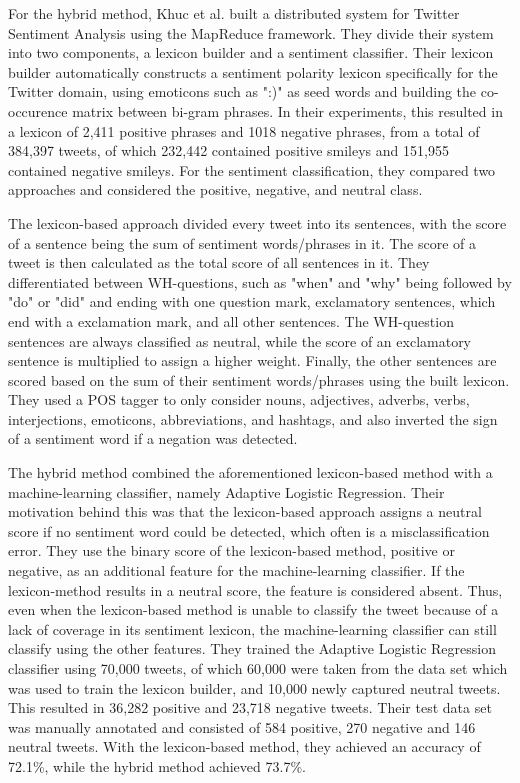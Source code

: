 For the hybrid method, Khuc et al. built a distributed system for Twitter Sentiment Analysis using the MapReduce framework. They divide their system into two components, a lexicon builder and a sentiment classifier. Their lexicon builder automatically constructs a sentiment polarity lexicon specifically for the Twitter domain, using emoticons such as ":)" as seed words and building the co-occurence matrix between bi-gram phrases. In their experiments, this resulted in a lexicon of 2,411 positive phrases and 1018 negative phrases, from a total of 384,397 tweets, of which 232,442 contained positive smileys and 151,955 contained negative smileys. For the sentiment classification, they compared two approaches and considered the positive, negative, and neutral class. 

The lexicon-based approach divided every tweet into its sentences, with the score of a sentence being the sum of sentiment words/phrases in it. The score of a tweet is then calculated as the total score of all sentences in it. They differentiated between WH-questions, such as "when" and "why" being followed by "do" or "did" and ending with one question mark, exclamatory sentences, which end with a exclamation mark, and all other sentences. The WH-question sentences are always classified as neutral, while the score of an exclamatory sentence is multiplied to assign a higher weight. Finally, the other sentences are scored based on the sum of their sentiment words/phrases using the built lexicon. They used a POS tagger to only consider nouns, adjectives, adverbs, verbs, interjections, emoticons, abbreviations, and hashtags, and also inverted the sign of a sentiment word if a negation was detected.

The hybrid method combined the aforementioned lexicon-based method with a machine-learning classifier, namely Adaptive Logistic Regression. Their motivation behind this was that the lexicon-based approach assigns a neutral score if no sentiment word could be detected, which often is a misclassification error. They use the binary score of the lexicon-based method, positive or negative, as an additional feature for the machine-learning classifier. If the lexicon-method results in a neutral score, the feature is considered absent. Thus, even when the lexicon-based method is unable to classify the tweet because of a lack of coverage in its sentiment lexicon, the machine-learning classifier can still classify using the other features. They trained the Adaptive Logistic Regression classifier using 70,000 tweets, of which 60,000 were taken from the data set which was used to train the lexicon builder, and 10,000 newly captured neutral tweets. This resulted in 36,282 positive and 23,718 negative tweets. Their test data set was manually annotated and consisted of 584 positive, 270 negative and 146 neutral tweets. With the lexicon-based method, they achieved an accuracy of 72.1\%, while the hybrid method achieved 73.7\%.










